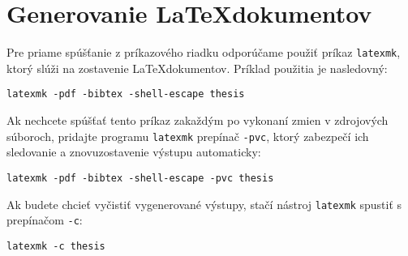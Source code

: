 \section{Generovanie \LaTeX dokumentov}

Pre priame spúšťanie z príkazového riadku odporúčame použiť príkaz {\tt latexmk}, ktorý slúži na zostavenie  \LaTeX dokumentov. Príklad použitia je nasledovný:

\begin{verbatim}
latexmk -pdf -bibtex -shell-escape thesis
\end{verbatim}

Ak nechcete spúšťať tento príkaz zakaždým po vykonaní zmien v zdrojových súboroch, pridajte programu {\tt latexmk} prepínač {\tt -pvc}, ktorý zabezpečí ich sledovanie a znovuzostavenie výstupu automaticky:

\begin{verbatim}
latexmk -pdf -bibtex -shell-escape -pvc thesis
\end{verbatim}

Ak budete chcieť vyčistiť vygenerované výstupy, stačí nástroj {\tt latexmk} spustiť s prepínačom {\tt -c}:

\begin{verbatim}
latexmk -c thesis
\end{verbatim}
